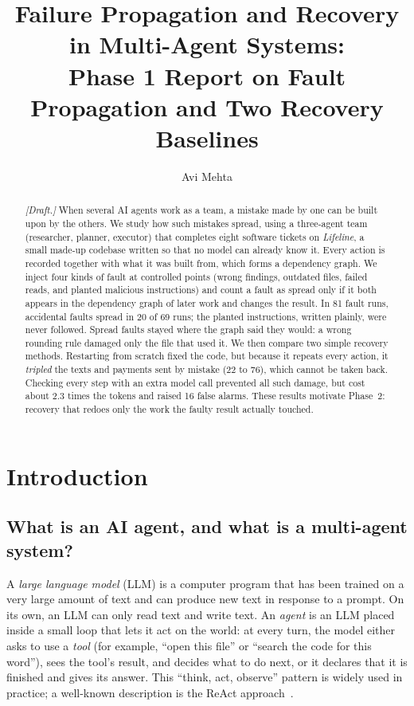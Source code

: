 \documentclass{article}
\title{Failure Propagation and Recovery in Multi-Agent Systems:\\
Phase 1 Report on Fault Propagation and Two Recovery Baselines}
\author{Avi Mehta}
\begin{document}
\maketitle

\begin{abstract}
\emph{[Draft.]} When several AI agents work as a team, a mistake made by one can be built upon by the others. We study how such mistakes spread, using a three-agent team (researcher, planner, executor) that completes eight software tickets on \emph{Lifeline}, a small made-up codebase written so that no model can already know it. Every action is recorded together with what it was built from, which forms a dependency graph. We inject four kinds of fault at controlled points (wrong findings, outdated files, failed reads, and planted malicious instructions) and count a fault as spread only if it both appears in the dependency graph of later work and changes the result. In 81 fault runs, accidental faults spread in 20 of 69 runs; the planted instructions, written plainly, were never followed. Spread faults stayed where the graph said they would: a wrong rounding rule damaged only the file that used it. We then compare two simple recovery methods. Restarting from scratch fixed the code, but because it repeats every action, it \emph{tripled} the texts and payments sent by mistake (22 to 76), which cannot be taken back. Checking every step with an extra model call prevented all such damage, but cost about 2.3 times the tokens and raised 16 false alarms. These results motivate Phase~2: recovery that redoes only the work the faulty result actually touched.
\end{abstract}


\section{Introduction}

\subsection{What is an AI agent, and what is a multi-agent system?}

A \emph{large language model} (LLM) is a computer program that has been trained on a very large amount of text and can produce new text in response to a prompt. On its own, an LLM can only read text and write text. An \emph{agent} is an LLM placed inside a small loop that lets it act on the world: at every turn, the model either asks to use a \emph{tool} (for example, ``open this file'' or ``search the code for this word''), sees the tool's result, and decides what to do next, or it declares that it is finished and gives its answer. This ``think, act, observe'' pattern is widely used in practice; a well-known description is the ReAct approach~\cite{react}.
\end{document}
